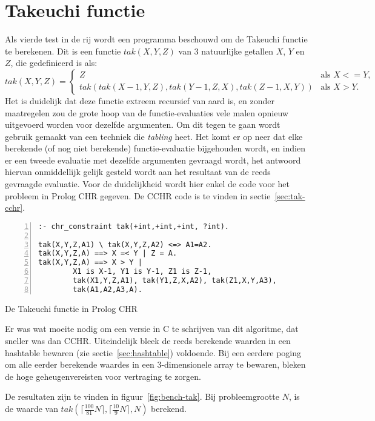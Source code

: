 \section{Takeuchi functie} \label{sec:bench-tak}

Als vierde test in de rij wordt een programma beschouwd om de Takeuchi functie te berekenen. Dit is een functie $tak(X,Y,Z)$ van 3 natuurlijke getallen $X$, $Y$ en $Z$, die gedefinieerd is als:
\begin{equation*}
tak(X,Y,Z) = 
\begin{cases} 
  Z & \text{als $X <= Y$,} \\
  tak(tak(X-1,Y,Z),tak(Y-1,Z,X),tak(Z-1,X,Y)) & \text{als $X > Y$.}
\end{cases}
\end{equation*}
Het is duidelijk dat deze functie extreem recursief van aard is, en zonder maatregelen zou de grote hoop van de functie-evaluaties vele malen opnieuw uitgevoerd worden voor dezelfde argumenten. Om dit tegen te gaan wordt gebruik gemaakt van een techniek die {\em tabling} heet. Het komt er op neer dat elke berekende (of nog niet berekende) functie-evaluatie bijgehouden wordt, en indien er een tweede evaluatie met dezelfde argumenten gevraagd wordt, het antwoord hiervan onmiddellijk gelijk gesteld wordt aan het resultaat van de reeds gevraagde evaluatie. Voor de  duidelijkheid wordt hier enkel de code voor het probleem in Prolog CHR gegeven. De CCHR code is te vinden in sectie~\ref{sec:tak-cchr}.
\begin{exCode}
\begin{Verbatim}[frame=single,numbers=left]
:- chr_constraint tak(+int,+int,+int, ?int).

tak(X,Y,Z,A1) \ tak(X,Y,Z,A2) <=> A1=A2.
tak(X,Y,Z,A) ==> X =< Y | Z = A.
tak(X,Y,Z,A) ==> X > Y | 
        X1 is X-1, Y1 is Y-1, Z1 is Z-1,
        tak(X1,Y,Z,A1), tak(Y1,Z,X,A2), tak(Z1,X,Y,A3),
        tak(A1,A2,A3,A).
\end{Verbatim}
\caption{\label{code:tak} De Takeuchi functie in Prolog CHR}
\end{exCode}
Er was wat moeite nodig om een versie in C te schrijven van dit algoritme, dat sneller was dan CCHR. Uiteindelijk bleek de reeds berekende waarden in een hashtable bewaren (zie sectie~\ref{sec:hashtable}) voldoende. Bij een eerdere poging om alle eerder berekende waardes in een 3-dimensionele array te bewaren, bleken de hoge geheugenvereisten voor vertraging te zorgen.

De resultaten zijn te vinden in figuur~\ref{fig:bench-tak}. Bij probleemgrootte $N$, is de waarde van $tak(\lceil\frac{100}{81}N\rceil,\lceil\frac{10}{9}N\rceil,N)$ berekend.

